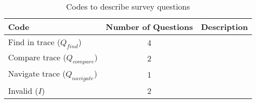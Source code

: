 
\begin{table}[ht]
\centering
  \begin{tabular}{lcl}
    \hline
    \textbf{Code}                   & \multicolumn{1}{l}{\textbf{Number of Questions}} & \textbf{Description} \\ \hline
    Find in trace ($Q_{find}$)      & 4                                                &                      \\
    Compare trace ($Q_{compare}$)   & 2                                                &                      \\
    Navigate trace ($Q_{navigate}$) & 1                                                &                      \\
    Invalid ($I$)                   & 2                                                &
  \end{tabular}
\caption{Codes to describe survey questions}
\end{table}

